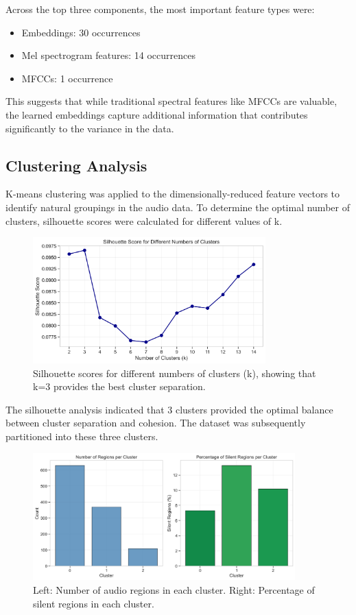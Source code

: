 \documentclass{article}
\begin{document}
Across the top three components, the most important feature types were:
\begin{itemize}
    \item Embeddings: 30 occurrences
    \item Mel spectrogram features: 14 occurrences
    \item MFCCs: 1 occurrence
\end{itemize}

This suggests that while traditional spectral features like MFCCs are valuable, the learned embeddings capture additional information that contributes significantly to the variance in the data.

\subsection{Clustering Analysis}

K-means clustering was applied to the dimensionally-reduced feature vectors to identify natural groupings in the audio data. To determine the optimal number of clusters, silhouette scores were calculated for different values of k.

\begin{figure}[H]
  \centering
  \includegraphics[width=0.8\textwidth]{figures/audio_features/silhouette_scores.png}
  \caption{Silhouette scores for different numbers of clusters (k), showing that k=3 provides the best cluster separation.}
  \label{fig:silhouette}
\end{figure}

The silhouette analysis indicated that 3 clusters provided the optimal balance between cluster separation and cohesion. The dataset was subsequently partitioned into these three clusters.

\begin{figure}[H]
  \centering
  \includegraphics[width=0.9\textwidth]{figures/audio_features/cluster_composition.png}
  \caption{Left: Number of audio regions in each cluster. Right: Percentage of silent regions in each cluster.}
  \label{fig:cluster_comp}
\end{figure}
\end{document}
